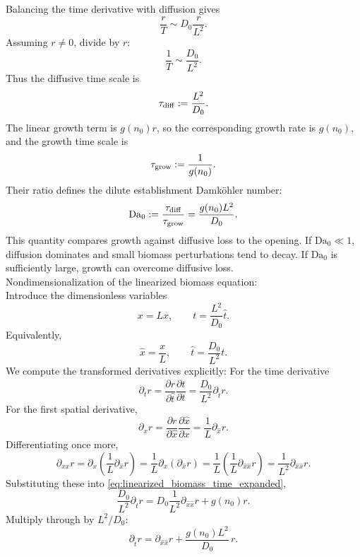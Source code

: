 \documentclass[11pt,a4paper]{report}
\begin{document}
	Balancing the time derivative with diffusion gives
	\[
	\frac{r}{T}\sim D_0\frac{r}{L^2}.
	\]
	Assuming $r\neq 0$, divide by $r$:
	\[
	\frac{1}{T}\sim \frac{D_0}{L^2}.
	\]
	Thus the diffusive time scale is
	\begin{equation}
		\tau_{\rm diff}:=\frac{L^2}{D_0}.
		\label{eq:tau_diff_expanded}
	\end{equation}
	The linear growth term is $g(n_0)r$, so the corresponding growth rate is $g(n_0)$, and the growth time scale is
	\begin{equation}
		\tau_{\rm grow}:=\frac{1}{g(n_0)}.
		\label{eq:tau_growth_expanded}
	\end{equation}
	Their ratio defines the dilute establishment Damk\"ohler number:
	\begin{align}
		\mathrm{Da}_0
		:=
		\frac{\tau_{\rm diff}}{\tau_{\rm grow}}
		=
		\frac{g(n_0)L^2}{D_0}.
	\end{align}
	This quantity compares growth against diffusive loss to the opening.  If $\mathrm{Da}_0\ll 1$, diffusion dominates and small biomass perturbations tend to decay.  If $\mathrm{Da}_0$ is sufficiently large, growth can overcome diffusive loss.\\
	Nondimensionalization of the linearized biomass equation:\\
	Introduce the dimensionless variables
	\begin{equation}
		x=L\hat{x},
		\qquad
		t=\frac{L^2}{D_0}\hat{t}.
		\label{eq:nondim_variables_expanded}
	\end{equation}
	Equivalently,
	\[
	\hat{x}=\frac{x}{L},
	\qquad
	\hat{t}=\frac{D_0}{L^2}t.
	\]
	We compute the transformed derivatives explicitly:
	For the time derivative
	\[
	\partial_t r
	=
	\frac{\partial r}{\partial \hat{t}}
	\frac{\partial \hat{t}}{\partial t}
	=
	\frac{D_0}{L^2}\partial_{\hat{t}}r.
	\]
	For the first spatial derivative,
	\[
	\partial_x r
	=
	\frac{\partial r}{\partial \hat{x}}
	\frac{\partial \hat{x}}{\partial x}
	=
	\frac{1}{L}\partial_{\hat{x}}r.
	\]
	Differentiating once more,
	\[
	\partial_{xx}r
	=
	\partial_x\!\left(\frac{1}{L}\partial_{\hat{x}}r\right)
	=
	\frac{1}{L}\partial_x(\partial_{\hat{x}}r)
	=
	\frac{1}{L}\left(\frac{1}{L}\partial_{\hat{x}\hat{x}}r\right)
	=
	\frac{1}{L^2}\partial_{\hat{x}\hat{x}}r.
	\]
	Substituting these into \eqref{eq:linearized_biomass_time_expanded},
	\[
	\frac{D_0}{L^2}\partial_{\hat{t}}r
	=
	D_0\frac{1}{L^2}\partial_{\hat{x}\hat{x}}r
	+
	g(n_0)r.
	\]
	Multiply through by $L^2/D_0$:
	\[
	\partial_{\hat{t}}r
	=
	\partial_{\hat{x}\hat{x}}r
	+
	\frac{g(n_0)L^2}{D_0}\,r.
	\]
\end{document}
